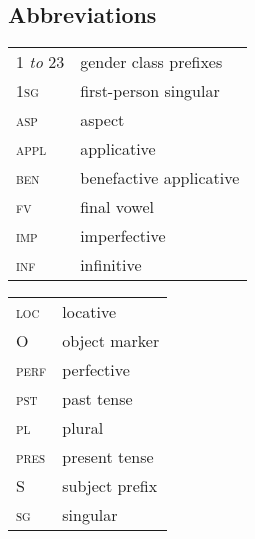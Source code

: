 \documentclass[output=paper]{langsci/langscibook}
\begin{document}
\subsection*{Abbreviations} 

\begin{tabularx}{.45\textwidth}{lX}
 1 \emph{to} 23 &  gender class prefixes\\
 1{\scshape sg} &  first-person singular\\
 {\scshape asp} & aspect\\
 {\scshape appl} & applicative\\
 {\scshape ben}  & benefactive applicative\\
 {\scshape fv} & final vowel\\
 {\scshape imp} &  imperfective\\
 {\scshape inf} &  infinitive\\
\end{tabularx}
\begin{tabularx}{.45\textwidth}{lX}
 {\scshape loc} &  locative\\
  {\scshape O} &  object marker\\
  {\scshape perf} &  perfective\\
  {\scshape pst} &  past tense\\
  {\scshape pl} & plural\\
  {\scshape pres} & present tense\\
  S  & subject prefix\\
  {\scshape sg} & singular\\
\end{tabularx}
% 

{
\sloppy
\printbibliography[heading=subbibliography,notkeyword=this]
}
\end{document}
